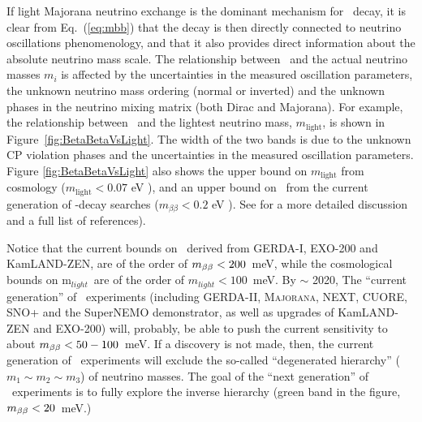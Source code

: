 If light Majorana neutrino exchange is the dominant mechanism for \bbonu\ decay, it is clear from Eq.~(\ref{eq:mbb}) that the decay is then directly connected to neutrino oscillations phenomenology, and that it also provides direct information about the absolute neutrino mass scale. The relationship between \mbb\ and the actual neutrino masses $m_i$ is affected by the uncertainties in the measured oscillation parameters, the unknown neutrino mass ordering (normal or inverted) and the unknown phases in the neutrino mixing matrix (both Dirac and Majorana). For example, the relationship between \mbb\ and the lightest neutrino mass, $m_\mathrm{light}$, is shown in Figure~\ref{fig:BetaBetaVsLight}. The width of the two bands is due to the unknown CP violation phases and the uncertainties in the measured oscillation parameters. Figure \ref{fig:BetaBetaVsLight} also shows the upper bound on $m_\mathrm{light}$ from cosmology ($m_\mathrm{light}<0.07$ eV ), and an upper bound on \mbb\ from the current generation of \bbonu-decay searches ($m_{\beta\beta}<0.2$ eV ). See \cite{Gomez-Cadenas:2015twa} for a more detailed discussion and a full list of references). 

Notice that the current bounds on \mbb\ derived from GERDA-I, EXO-200 and KamLAND-ZEN, are of the order of $m_{\beta\beta} < 200$~meV, while the cosmological bounds on m$_{light}$~are of the order of
$m_{light} < 100$~meV. By $\sim$ 2020, The ``current generation'' of \bbonu\ experiments (including GERDA-II, {\scshape Majorana}, NEXT, CUORE, SNO+  and the SuperNEMO demonstrator, as well as upgrades of KamLAND-ZEN and EXO-200) will, probably, be able to push the current sensitivity to about $m_{\beta\beta} < 50-100$~meV. If a discovery is not made, then, the current generation of \bbonu\ experiments will exclude the so-called ``degenerated hierarchy'' ($m_1 \sim m_2 \sim m_3$) of neutrino masses. The goal of the ``next generation'' of \bbonu\ experiments is to fully explore the inverse hierarchy (green band in the figure, $m_{\beta\beta} < 20$~meV.)

